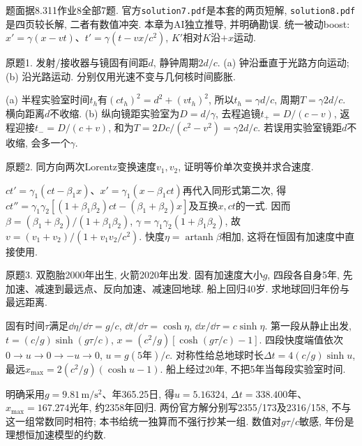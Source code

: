 题面据8.311作业8全部7题. 官方\texttt{solution7.pdf}是本套的两页短解, \texttt{solution8.pdf}是四页较长解, 二者有数值冲突. 本章为AI独立推导, 并明确勘误. 统一被动boost: $x'=\gamma(x-vt)$、$t'=\gamma(t-vx/c^2)$, $K'$相对$K$沿$+x$运动.
\begin{exercise}
原题1. 发射/接收器与镜固有间距$d$, 静钟周期$2d/c$. (a) 钟沿垂直于光路方向运动; (b) 沿光路运动. 分别仅用光速不变与几何核时间膨胀.
\end{exercise}
\begin{solution}
(a) 半程实验室时间$t_h$有$(ct_h)^2=d^2+(vt_h)^2$, 所以$t_h=\gamma d/c$, 周期$T=\gamma2d/c$. 横向距离$d$不收缩. (b) 纵向镜距实验室为$D=d/\gamma$, 去程追镜$t_+=D/(c-v)$, 返程迎接$t_-=D/(c+v)$, 和为$T=2Dc/(c^2-v^2)=\gamma2d/c$. 若误用实验室镜距$d$不收缩, 会多一个$\gamma$.
\begin{center}\end{center}
\end{solution}
\begin{exercise}
原题2. 同方向两次Lorentz变换速度$v_1,v_2$, 证明等价单次变换并求合速度.
\end{exercise}
\begin{solution}
$ct'=\gamma_1(ct-\beta_1x)$、$x'=\gamma_1(x-\beta_1ct)$再代入同形式第二次, 得$ct''=\gamma_1\gamma_2[(1+\beta_1\beta_2)ct-(\beta_1+\beta_2)x]$及互换$x,ct$的一式. 因而$\beta=(\beta_1+\beta_2)/(1+\beta_1\beta_2)$, $\gamma=\gamma_1\gamma_2(1+\beta_1\beta_2)$, 故$v=(v_1+v_2)/(1+v_1v_2/c^2)$. 快度$\eta=\operatorname{artanh}\beta$相加, 这将在恒固有加速度中直接使用.
\end{solution}
\begin{exercise}
原题3. 双胞胎2000年出生, 火箭2020年出发. 固有加速度大小$g$, 四段各自身5年, 先加速、减速到最远点、反向加速、减速回地球. 船上回归40岁. 求地球回归年份与最远距离.
\end{exercise}
\begin{solution}
固有时间$\tau$满足$\dd\eta/\dd\tau=g/c$, $\dd t/\dd\tau=\cosh\eta$, $\dd x/\dd\tau=c\sinh\eta$. 第一段从静止出发, $t=(c/g)\sinh(g\tau/c)$, $x=(c^2/g)[\cosh(g\tau/c)-1]$. 四段快度端值依次$0\to u\to0\to-u\to0$, $u=g(5\text{年})/c$. 对称性给总地球时长$\Delta t=4(c/g)\sinh u$, 最远$x_{\max}=2(c^2/g)(\cosh u-1)$. 船上经过20年, 不把5年当每段实验室时间.

明确采用$g=9.81\,\mathrm{m/s^2}$、年365.25日, 得$u=5.16324$, $\Delta t=338.400$年、$x_{\max}=167.274$光年, 约2358年回归. 两份官方解分别写2355/173及2316/158, 不与这一组常数同时相符; 本书给统一独算而不强行抄某一组. 数值对$g\tau/c$敏感, 年份是理想恒加速模型的约数.
\end{solution}
